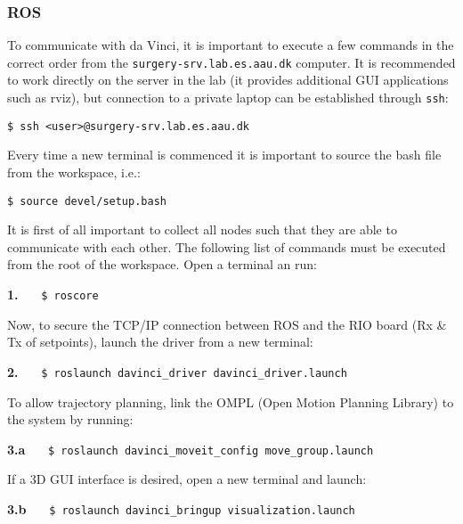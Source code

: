 \subsubsection*{ROS}
To communicate with da Vinci, it is important to execute a few commands in the correct order from the \texttt{surgery-srv.lab.es.aau.dk} computer. It is recommended to work directly on the server in the lab (it provides additional GUI applications such as rviz), but connection to a private laptop can be established through \texttt{ssh}:

\hspace{1cm} \texttt{\$ ssh <user>@surgery-srv.lab.es.aau.dk}

Every time a new terminal is commenced it is important to source the bash file from the workspace, i.e.:

\hspace{1cm} \texttt{\$ source devel/setup.bash}

It is first of all important to collect all \gls{node}s such that they are able to communicate with each other. The following list of commands must be executed from the root of the workspace. Open a terminal an run:

\hspace{1cm} \textbf{1.} \ \ \ \texttt{\$ roscore} \ \ \ {}

Now, to secure the TCP/IP connection between ROS and the RIO board (Rx \& Tx of setpoints), launch the driver from a new terminal:

\hspace{1cm} \textbf{2.} \ \ \  \texttt{\$ roslaunch davinci\_driver davinci\_driver.launch} \ \ \ {} 

To allow trajectory planning, link the OMPL (Open Motion Planning Library) to the system by running: 

\hspace{1cm} \textbf{3.a} \ \ \  \texttt{\$ roslaunch davinci\_moveit\_config move\_group.launch} \ \ \ {} 

If a 3D GUI interface is desired, open a new terminal and launch:

\hspace{1cm} \textbf{3.b} \ \ \  \texttt{\$ roslaunch davinci\_bringup visualization.launch} \ \ \ {} 

